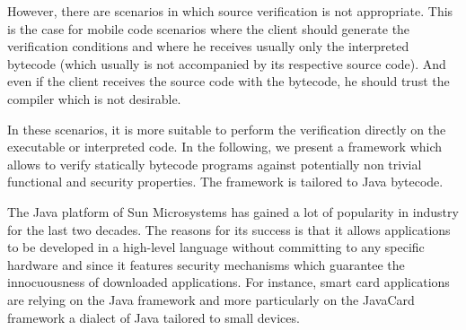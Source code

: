 However, there are scenarios in which source verification is not appropriate. 
This is the case for mobile code scenarios where the client should generate the verification conditions and where he receives usually only
the interpreted bytecode (which usually is not accompanied by its respective source code). And even if the client receives the source code
 with the bytecode, he should trust the compiler which is not desirable. 

In these scenarios, it is more suitable to perform the verification  directly on the  executable or interpreted code.
In the following, we present a framework which allows to verify statically bytecode programs 
against potentially non trivial functional and security properties. The framework is tailored to Java bytecode.

 The Java platform  of Sun Microsystems has gained a lot of popularity in industry  for the last two decades.
 The reasons for its  success is that it allows applications to 
 be developed in a high-level language without committing to any
 specific hardware and since it features security mechanisms which
 guarantee the innocuousness of downloaded applications. 
 For instance, smart card applications are relying on the Java framework and
 more particularly on the JavaCard framework a dialect of Java tailored to small devices. 

